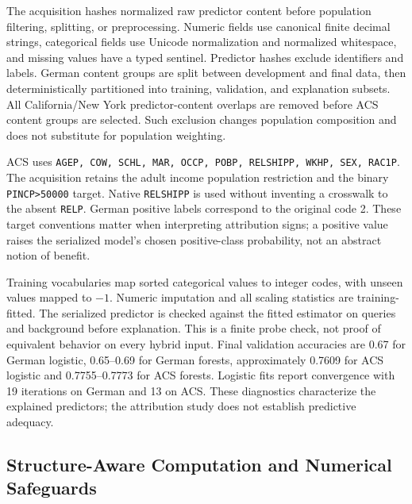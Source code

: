 \documentclass{article}
\begin{document}
The acquisition hashes normalized raw predictor content before population filtering, splitting, or preprocessing. Numeric fields use canonical finite decimal strings, categorical fields use Unicode normalization and normalized whitespace, and missing values have a typed sentinel. Predictor hashes exclude identifiers and labels. German content groups are split between development and final data, then deterministically partitioned into training, validation, and explanation subsets. All California/New York predictor-content overlaps are removed before ACS content groups are selected. Such exclusion changes population composition and does not substitute for population weighting.

ACS uses \texttt{AGEP, COW, SCHL, MAR, OCCP, POBP, RELSHIPP, WKHP, SEX, RAC1P}. The acquisition retains the adult income population restriction and the binary \texttt{PINCP>50000} target. Native \texttt{RELSHIPP} is used without inventing a crosswalk to the absent \texttt{RELP}. German positive labels correspond to the original code 2. These target conventions matter when interpreting attribution signs; a positive value raises the serialized model's chosen positive-class probability, not an abstract notion of benefit.

Training vocabularies map sorted categorical values to integer codes, with unseen values mapped to $-1$. Numeric imputation and all scaling statistics are training-fitted. The serialized predictor is checked against the fitted estimator on queries and background before explanation. This is a finite probe check, not proof of equivalent behavior on every hybrid input. Final validation accuracies are 0.67 for German logistic, 0.65--0.69 for German forests, approximately 0.7609 for ACS logistic and 0.7755--0.7773 for ACS forests. Logistic fits report convergence with 19 iterations on German and 13 on ACS. These diagnostics characterize the explained predictors; the attribution study does not establish predictive adequacy.

\subsection{Structure-Aware Computation and Numerical Safeguards}
\end{document}
